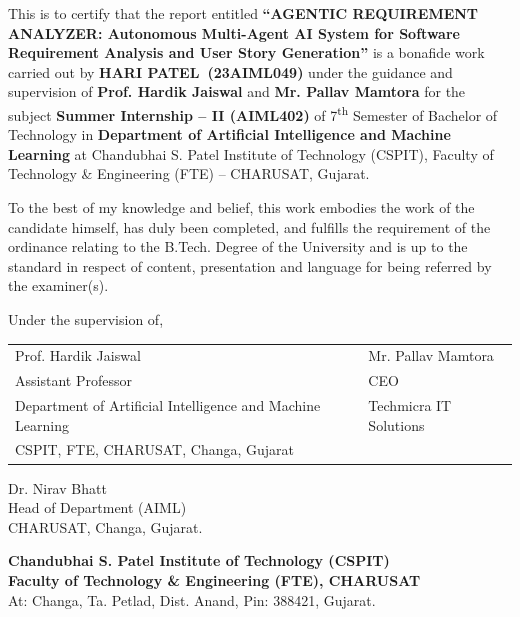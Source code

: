 \documentclass[12pt,a4paper,openany]{report}
\newcommand{\reporttitle}{AGENTIC REQUIREMENT ANALYZER}
\newcommand{\subtitle}{Autonomous Multi-Agent AI System for Software Requirement Analysis and User Story Generation}
\newcommand{\student}{HARI PATEL}
\newcommand{\rollno}{23AIML049}
\newcommand{\internalguide}{Prof. Hardik Jaiswal}
\newcommand{\externalguide}{Mr. Pallav Mamtora}
\newcommand{\externaltitle}{CEO}
\newcommand{\company}{Techmicra IT Solutions}
\newcommand{\hod}{Dr. Nirav Bhatt}
\begin{document}
\begin{center}
\begin{minipage}{0.78\textwidth}
\fontsize{10.5}{16}\selectfont

\noindent
This is to certify that the report entitled \textbf{``\reporttitle: \subtitle''}
is a bonafide work carried out by \textbf{\student\ (\rollno)} under the
guidance and supervision of \textbf{\internalguide} and
\textbf{\externalguide} for the subject \textbf{Summer Internship -- II
(AIML402)} of 7\textsuperscript{th} Semester of Bachelor of Technology in
\textbf{Department of Artificial Intelligence and Machine Learning} at
Chandubhai S. Patel Institute of Technology (CSPIT), Faculty of Technology
\& Engineering (FTE) -- CHARUSAT, Gujarat.

\vspace{0.4cm}
\noindent
To the best of my knowledge and belief, this work embodies the work of the
candidate himself, has duly been completed, and fulfills the requirement
of the ordinance relating to the B.Tech. Degree of the University and is up
to the standard in respect of content, presentation and language for being
referred by the examiner(s).

\vspace{0.6cm}
\noindent Under the supervision of,
\vspace{0.4cm}

\noindent
\begin{tabular}{@{}p{} p{}@{}}
\internalguide & \externalguide \\
Assistant Professor & \externaltitle \\
Department of Artificial Intelligence and Machine Learning & \company \\
CSPIT, FTE, CHARUSAT, Changa, Gujarat & \\
\end{tabular}

\vspace{0.6cm}
\noindent
\hod\\
Head of Department (AIML)\\
CHARUSAT, Changa, Gujarat.

\end{minipage}
\end{center}

\vspace{0.6cm}
\begin{center}
\fontsize{12}{14}\selectfont
\textbf{Chandubhai S. Patel Institute of Technology (CSPIT)}\\[0.10cm]
\textbf{Faculty of Technology \& Engineering (FTE), CHARUSAT}\\[0.10cm]
\fontsize{9.8}{12}\selectfont
At: Changa, Ta. Petlad, Dist. Anand, Pin: 388421, Gujarat.
\end{center}
\end{document}

